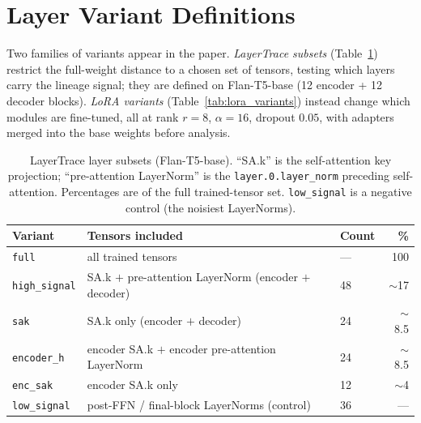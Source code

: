 \documentclass{article}
\theoremstyle{definition}
\theoremstyle{plain}
\begin{document}
\section{Layer Variant Definitions}
\label{app:layers}
Two families of variants appear in the paper. \emph{LayerTrace subsets} (Table~\ref{tab:layer_subsets})
restrict the full-weight distance to a chosen set of tensors, testing which layers carry the lineage
signal; they are defined on Flan-T5-base (12 encoder + 12 decoder blocks). \emph{LoRA variants}
(Table~\ref{tab:lora_variants}) instead change which modules are fine-tuned, all at rank $r=8$,
$\alpha=16$, dropout $0.05$, with adapters merged into the base weights before analysis.

\begin{table}[h]
\caption{LayerTrace layer subsets (Flan-T5-base). ``SA.k'' is the self-attention key projection;
``pre-attention LayerNorm'' is the \texttt{layer.0.layer\_norm} preceding self-attention. Percentages
are of the full trained-tensor set. \texttt{low\_signal} is a negative control (the noisiest LayerNorms).}
\label{tab:layer_subsets}
\centering
\begin{tabular}{lll r}
\toprule
Variant & Tensors included & Count & \% \\
\midrule
\texttt{full}        & all trained tensors                                   & ---  & 100 \\
\texttt{high\_signal}& SA.k $+$ pre-attention LayerNorm (encoder $+$ decoder) & 48   & $\sim$17 \\
\texttt{sak}         & SA.k only (encoder $+$ decoder)                       & 24   & $\sim$8.5 \\
\texttt{encoder\_h}  & encoder SA.k $+$ encoder pre-attention LayerNorm      & 24   & $\sim$8.5 \\
\texttt{enc\_sak}    & encoder SA.k only                                     & 12   & $\sim$4 \\
\texttt{low\_signal} & post-FFN / final-block LayerNorms (control)           & 36   & --- \\
\bottomrule
\end{tabular}
\end{table}
\end{document}
